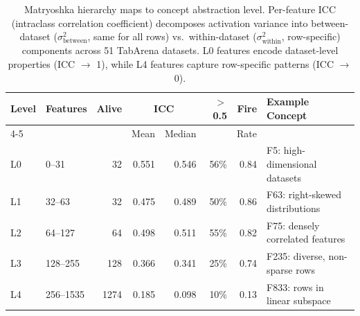 \begin{table}[t]
\centering
\caption{Matryoshka hierarchy maps to concept abstraction level. Per-feature ICC (intraclass correlation coefficient) decomposes activation variance into between-dataset ($\sigma^2_\text{between}$, same for all rows) vs.\ within-dataset ($\sigma^2_\text{within}$, row-specific) components across 51 TabArena datasets. L0 features encode dataset-level properties (ICC $\to$ 1), while L4 features capture row-specific patterns (ICC $\to$ 0).}
\label{tab:matryoshka-icc}
\small
\begin{tabular}{@{}llrrrrrl@{}}
\toprule
Level & Features & Alive & \multicolumn{2}{c}{ICC} & $>$0.5 & Fire & Example Concept \\
\cmidrule(lr){4-5}
& & & Mean & Median & & Rate & \\
\midrule
L0 & 0--31    &   32 & 0.551 & 0.546 & 56\% & 0.84 & F5: high-dimensional datasets \\
L1 & 32--63   &   32 & 0.475 & 0.489 & 50\% & 0.86 & F63: right-skewed distributions \\
L2 & 64--127  &   64 & 0.498 & 0.511 & 55\% & 0.82 & F75: densely correlated features \\
L3 & 128--255 &  128 & 0.366 & 0.341 & 25\% & 0.74 & F235: diverse, non-sparse rows \\
L4 & 256--1535 & 1274 & 0.185 & 0.098 & 10\% & 0.13 & F833: rows in linear subspace \\
\bottomrule
\end{tabular}
\end{table}
